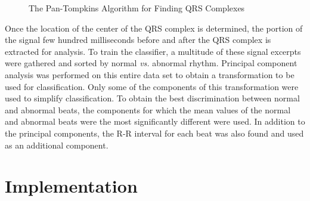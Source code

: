 \documentclass[12pt,letter]{article}
\begin{document}
\begin{figure}[hbtp]
    \centering
    \caption{The Pan-Tompkins Algorithm for Finding QRS Complexes}
    \label{fig:pan}
\end{figure}

Once the location of the center of the QRS complex is determined, the portion of
the signal few hundred milliseconds before and after the QRS complex is
extracted for analysis.  To train the classifier, a multitude of these signal
excerpts were gathered and sorted by normal \textit{vs.} abnormal rhythm.
Principal component analysis was performed on this entire data set to obtain a
transformation to be used for classification.  Only some of the components of
this transformation were used to simplify classification.  To obtain the best
discrimination between normal and abnormal beats, the components for which the
mean values of the normal and abnormal beats were the most significantly
different were used.  In addition to the principal components, the R-R interval
for each beat was also found and used as an additional component.  

\section{Implementation}
\end{document}
